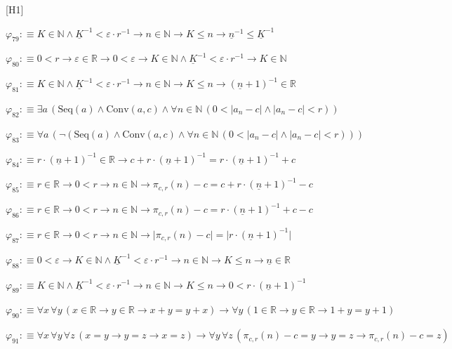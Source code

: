 \begin{fullproof}{[H1]}
\begin{abbrevlist}
\item $\varphi_{79} :\equiv K \in \mathbb{N} \land \underline{K}^{-1} < \varepsilon \cdot r^{-1} \to n \in \mathbb{N} \to K \leq n \to \underline{n}^{-1} \leq \underline{K}^{-1}$
\item $\varphi_{80} :\equiv 0 < r \to \varepsilon \in \mathbb{R} \to 0 < \varepsilon \to K \in \mathbb{N} \land \underline{K}^{-1} < \varepsilon \cdot r^{-1} \to K \in \mathbb{N}$
\item $\varphi_{81} :\equiv K \in \mathbb{N} \land \underline{K}^{-1} < \varepsilon \cdot r^{-1} \to n \in \mathbb{N} \to K \leq n \to (\underline{n} + 1)^{-1} \in \mathbb{R}$
\item $\varphi_{82} :\equiv \exists a\,(\mathrm{Seq}(a) \land \mathrm{Conv}(a,c) \land \forall n \in \mathbb{N}\,(0 < \lvert a_{n} - c \rvert \land \lvert a_{n} - c \rvert < r))$
\item $\varphi_{83} :\equiv \forall a\,(\neg (\mathrm{Seq}(a) \land \mathrm{Conv}(a,c) \land \forall n \in \mathbb{N}\,(0 < \lvert a_{n} - c \rvert \land \lvert a_{n} - c \rvert < r)))$
\item $\varphi_{84} :\equiv r \cdot (\underline{n} + 1)^{-1} \in \mathbb{R} \to c + r \cdot (\underline{n} + 1)^{-1} = r \cdot (\underline{n} + 1)^{-1} + c$
\item $\varphi_{85} :\equiv r \in \mathbb{R} \to 0 < r \to n \in \mathbb{N} \to \pi_{c,r}(n) - c = c + r \cdot (\underline{n} + 1)^{-1} - c$
\item $\varphi_{86} :\equiv r \in \mathbb{R} \to 0 < r \to n \in \mathbb{N} \to \pi_{c,r}(n) - c = r \cdot (\underline{n} + 1)^{-1} + c - c$
\item $\varphi_{87} :\equiv r \in \mathbb{R} \to 0 < r \to n \in \mathbb{N} \to \lvert \pi_{c,r}(n) - c \rvert = \lvert r \cdot (\underline{n} + 1)^{-1} \rvert$
\item $\varphi_{88} :\equiv 0 < \varepsilon \to K \in \mathbb{N} \land \underline{K}^{-1} < \varepsilon \cdot r^{-1} \to n \in \mathbb{N} \to K \leq n \to \underline{n} \in \mathbb{R}$
\item $\varphi_{89} :\equiv K \in \mathbb{N} \land \underline{K}^{-1} < \varepsilon \cdot r^{-1} \to n \in \mathbb{N} \to K \leq n \to 0 < r \cdot (\underline{n} + 1)^{-1}$
\item $\varphi_{90} :\equiv \forall x\,\forall y\,(x \in \mathbb{R} \to y \in \mathbb{R} \to x + y = y + x) \to \forall y\,(1 \in \mathbb{R} \to y \in \mathbb{R} \to 1 + y = y + 1)$
\item $\varphi_{91} :\equiv \forall x\,\forall y\,\forall z\,(x = y \to y = z \to x = z) \to \forall y\,\forall z\,(\pi_{c,r}(n) - c = y \to y = z \to \pi_{c,r}(n) - c = z)$

\end{abbrevlist}
\end{fullproof}
